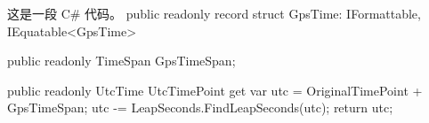 \documentclass[codepkg=minted]{course-report}
\begin{document}
\begin{codebox*}[minted language=csharp, minted options={linenos=false}]{这是一段 C\# 代码。}
public readonly record struct GpsTime: IFormattable, IEquatable<GpsTime>
{
    public readonly TimeSpan GpsTimeSpan;

    public readonly UtcTime UtcTimePoint
    {
        get
        {
            var utc = OriginalTimePoint + GpsTimeSpan;
            utc -= LeapSeconds.FindLeapSeconds(utc);
            return utc;
        }
    }
}
\end{codebox*}
\end{document}
